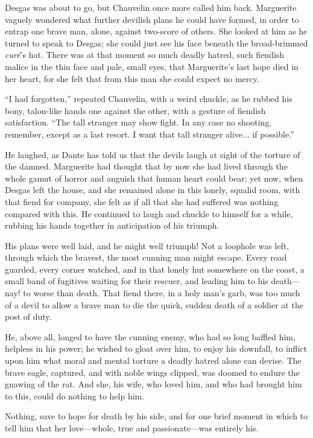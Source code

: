 \documentclass[paper=a5,BCOR=7mm,twoside,DIV=calc,12pt,usegeometry,chapterprefix,endperiod,headings=big]{scrbook}
\begin{document}
Desgas was about to go, but Chauvelin once more called him back. Marguerite vaguely wondered what further devilish plans he could have formed, in order to entrap one brave man, alone, against two-score of others. She looked at him as he turned to speak to Desgas; she could just see his face beneath the broad-brimmed \textit{curé}'s hat. There was at that moment so much deadly hatred, such fiendish malice in the thin face and pale, small eyes, that Marguerite's last hope died in her heart, for she felt that from this man she could expect no mercy.

\enquote{I had forgotten,} repeated Chauvelin, with a weird chuckle, as he rubbed his bony, talon-like hands one against the other, with a gesture of fiendish satisfaction. \enquote{The tall stranger may show fight. In any case no shooting, remember, except as a last resort. I want that tall stranger alive... if possible.}

He laughed, as Dante has told us that the devils laugh at sight of the torture of the damned. Marguerite had thought that by now she had lived through the whole gamut of horror and anguish that human heart could bear; yet now, when Desgas left the house, and she remained alone in this lonely, squalid room, with that fiend for company, she felt as if all that she had suffered was nothing compared with this. He continued to laugh and chuckle to himself for a while, rubbing his hands together in anticipation of his triumph.

His plans were well laid, and he might well triumph! Not a loophole was left, through which the bravest, the most cunning man might escape. Every road guarded, every corner watched, and in that lonely hut somewhere on the coast, a small band of fugitives waiting for their rescuer, and leading him to his death---nay! to worse than death. That fiend there, in a holy man's garb, was too much of a devil to allow a brave man to die the quick, sudden death of a soldier at the post of duty.

He, above all, longed to have the cunning enemy, who had so long baffled him, helpless in his power; he wished to gloat over him, to enjoy his downfall, to inflict upon him what moral and mental torture a deadly hatred alone can devise. The brave eagle, captured, and with noble wings clipped, was doomed to endure the gnawing of the rat. And she, his wife, who loved him, and who had brought him to this, could do nothing to help him.

Nothing, save to hope for death by his side, and for one brief moment in which to tell him that her love---whole, true and passionate---was entirely his.
\end{document}
